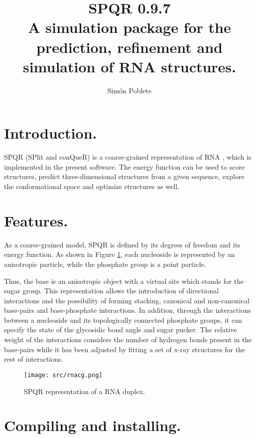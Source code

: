\documentclass{article}
\title{SPQR 0.9.7\\A simulation package for the prediction, refinement and simulation of RNA structures.}
\author{Sim\'on Poblete}
\date{}
\begin{document}
\maketitle
\section{Introduction.}

SPQR (SPlit and conQueR) is a coarse-grained representation of RNA \cite{spqr1, spqr2}, which is implemented in the present software. The energy function can be used to score structures, predict three-dimensional structures from a given sequence, explore the conformational space and optimize structures as well. 



\section{Features.}




As a coarse-grained model, SPQR is defined by its degrees of freedom and its energy function. As shown in Figure \ref{cg-rep}, each nucleoside is represented by an anisotropic particle, while the phosphate group is a point particle.

Thus, the base is an anisotropic object with a virtual site which stands for the sugar group.
This representation allows the introduction of directional interactions and the possibility of forming stacking, canonical and non-canonical base-pairs and base-phosphate interactions. In addition, through the interactions between a nucleoside and its topologically connected phosphate groups, it can specify the state of the glycosidic bond angle and sugar pucker. The relative weight of the interactions considers the number of hydrogen bonds present in the base-pairs while it has been adjusted by fitting a set of x-ray structures for the rest of interactions.

\begin{figure}
\begin{center}
  \texttt{[image: src/rnacg.png]}
  \caption{SPQR representation of a RNA duplex.}
\label{cg-rep}
\end{center}
\end{figure}


\section{Compiling and installing.}
\end{document}
